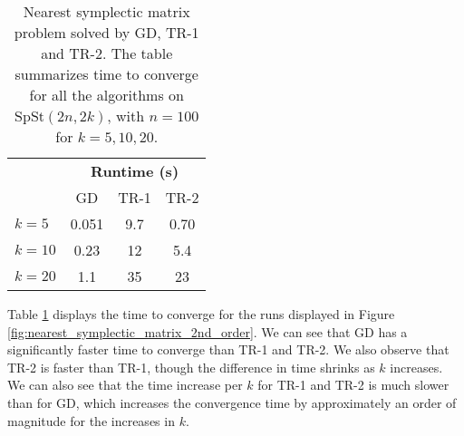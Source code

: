 \begin{table}
    \centering
    \caption[Nearest symplectic matrix problem solved by GD, TR-1 and TR-2 timetable]{Nearest symplectic matrix problem solved by GD, TR-1 and TR-2. The table summarizes time to converge for all the algorithms on $\mathrm{SpSt}(2n, 2k)$, with $n=100$ for $k={5,10,20}$.}\label{tab:exp1}
    \begin{tabular}{ l c c c }\label{tbl:Nearest_symplectic_matrix_2nd_order}
        & \multicolumn{3}{c}{\textbf{Runtime (s)}} \\ 
        \cmidrule(l){2-4}
        & GD & TR-1 & TR-2 \\
        \midrule
        $k=5$ & 0.051 & 9.7 & 0.70 \\
        $k=10$ & 0.23 & 12 & 5.4 \\
        $k=20$ & 1.1 & 35 & 23 \\        
    \end{tabular}
\end{table}
Table \ref{tbl:Nearest_symplectic_matrix_2nd_order} displays the time to converge for the runs displayed in Figure \ref{fig:nearest_symplectic_matrix_2nd_order}. We can see that GD has a significantly faster time to converge than TR-1 and TR-2. We also observe that TR-2 is faster than TR-1, though the difference in time shrinks as $k$ increases. We can also see that the time increase per $k$ for TR-1 and TR-2 is much slower than for GD, which increases the convergence time by approximately an order of magnitude for the increases in $k$. 







        

